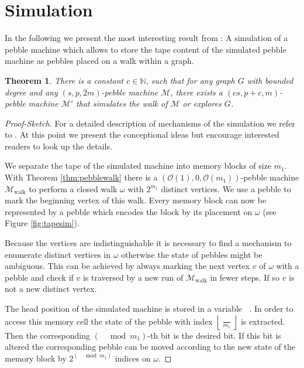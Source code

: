 \documentclass[oneside]{scrartcl}
\newtheorem{thm}{Theorem}
\DeclareMathOperator{\Thead}{T_{\text{head}}}
\begin{document}
\section{Simulation}
In the following we present the most interesting result from
\cite{pebbles}: A simulation of a pebble machine which allows to store
the tape content of the simulated pebble machine as pebbles placed on a
walk within a graph.
\begin{thm}
  \label{thm:simulation}
  There is a constant $c\in\mathbb{N}$, such that for any graph $G$ with
  bounded degree and any $(s,p,2m)$-pebble machine $\mathcal{M}$, there
  exists a $(cs,p+c,m)$-pebble machine $\mathcal{M}'$ that simulates the
  walk of $\mathcal{M}$ or explores $G$.
\end{thm}
\begin{proof}[Proof-Sketch]
  For a detailed description of mechanisms of the simulation we refer to
  \cite{pebbles}. At this point we present the conceptional ideas but encourage
  interested readers to look up the details.
  
  We separate the tape of the simulated machine into memory blocks of size
  $m_1$. With Theorem \ref{thm:pebblewalk} there is a
  $(\mathcal{O}(1),0,\mathcal{O}(m_{1}))$-pebble machine
  $\mathcal{M}_{\text{walk}}$ to perform a closed walk $\omega$ with
  $2^{m_{1}}$ distinct vertices. We use a pebble to mark the beginning vertex
  of this walk. Every memory block can now be represented by
  a pebble which encodes the block by its placement on $\omega$ (see
  Figure \ref{fig:tapesim}).

  Because the vertices are indistinguishable it is necessary to find a
  mechanism to enumerate distinct vertices in $\omega$ otherwise the state of
  pebbles might be ambiguous. This can be achieved by always marking the next
  vertex $v$ of $\omega$ with a pebble and check if $v$ is
  traversed by a new run of $\mathcal{M}_{\text{walk}}$ in fewer steps. If so
  $v$ is not a new distinct vertex.

  The head position of the simulated machine is stored in a variable $\Thead$.
  In order to access this memory cell the state of the pebble with index
  $\left\lfloor \frac{\Thead}{m_{1}}\right\rfloor$ is extracted. Then the
  corresponding $(\Thead\mod m_{1})$-th bit is the desired bit. If this bit is
  altered the corresponding pebble can be moved according to the new state of
  the memory block by $2^{(\Thead\mod m_{1})}$ indices on $\omega$.


\end{proof}
\end{document}
